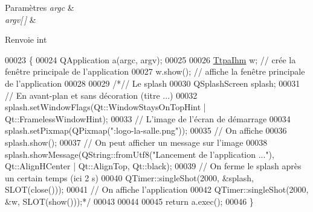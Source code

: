 \begin{DoxyParams}{Paramètres}
{\em argc} & \\
\hline
{\em argv\mbox{[}$\,$\mbox{]}} & \\
\hline
\end{DoxyParams}
\begin{DoxyReturn}{Renvoie}
int 
\end{DoxyReturn}

\begin{DoxyCode}
00023 \{
00024     QApplication a(argc, argv);
00025 
00026     \hyperlink{class_ttpa_ihm}{TtpaIhm} w; \textcolor{comment}{// crée la fenêtre principale de l'application}
00027     w.show(); \textcolor{comment}{// affiche la fenêtre principale de l'application}
00028 
00029     \textcolor{comment}{/*// Le splash}
00030 \textcolor{comment}{    QSplashScreen splash;}
00031 \textcolor{comment}{    // En avant-plan et sans décoration (titre ...)}
00032 \textcolor{comment}{    splash.setWindowFlags(Qt::WindowStaysOnTopHint | Qt::FramelessWindowHint);}
00033 \textcolor{comment}{    // L'image de l'écran de démarrage}
00034 \textcolor{comment}{    splash.setPixmap(QPixmap(":logo-la-salle.png"));}
00035 \textcolor{comment}{    // On affiche}
00036 \textcolor{comment}{    splash.show();}
00037 \textcolor{comment}{    // On peut afficher un message sur l'image}
00038 \textcolor{comment}{    splash.showMessage(QString::fromUtf8("Lancement de l'application ..."), Qt::AlignHCenter |
       Qt::AlignTop, Qt::black);}
00039 \textcolor{comment}{    // On ferme le splash après un certain temps (ici 2 s)}
00040 \textcolor{comment}{    QTimer::singleShot(2000, &splash, SLOT(close()));}
00041 \textcolor{comment}{    // On affiche l'application}
00042 \textcolor{comment}{    QTimer::singleShot(2000, &w, SLOT(show()));*/}
00043 
00044 
00045     \textcolor{keywordflow}{return} a.exec();
00046 \}
\end{DoxyCode}
